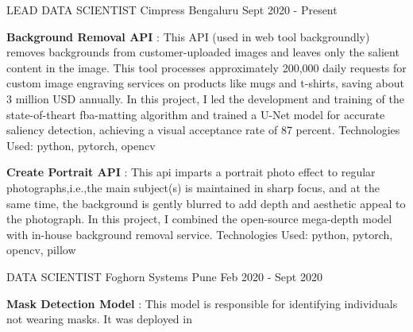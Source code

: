 
\begin{cventries}

    \cventry
    {LEAD DATA SCIENTIST} %
    {Cimpress} %
    {Bengaluru} %
    {Sept 2020 - Present} %
    {
      \begin{cvitems} %
      \item{\textbf{Background Removal API} : This API (used in web tool backgroundly) removes 
      backgrounds from customer-uploaded images and leaves only the salient 
      content in the image. This tool processes approximately 200,000 
      daily requests for custom image engraving services on products 
      like mugs and t-shirts, saving about 3 million USD annually. In this 
      project, I led the development and training of the state-of-theart 
      fba-matting algorithm and trained a U-Net model for accurate saliency 
      detection, achieving a visual acceptance rate of 87 percent. 
      Technologies Used: python, pytorch, opencv }
      \item{\textbf{Create Portrait API} : This api imparts a portrait photo effect to
      regular photographs,i.e.,the main subject(s) is maintained in sharp focus, 
      and at the same time, the background is gently blurred to add depth and 
      aesthetic appeal to the photograph. In this project, I combined the 
      open-source mega-depth model with in-house background removal service. 
      Technologies Used: python, pytorch, opencv, pillow }
	\end{cvitems}
    }
\vspace{2em} %
  \cventry
    {DATA SCIENTIST} %
    {Foghorn Systems} %
    {Pune} %
    {Feb 2020 - Sept 2020} %
    {
      \begin{cvitems} %
      \item{\textbf {Mask Detection Model} : This model is responsible for identifying individuals not wearing masks. It was deployed in 
}
\end{cvitems}}
\end{cventries}
